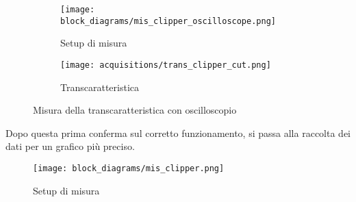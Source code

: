 \begin{figure}[H]
    \centering

    \begin{subfigure}{.5\textwidth}
        \centering
        \texttt{[image: block\_diagrams/mis\_clipper\_oscilloscope.png]}
        \caption{Setup di misura}
        \label{mis_clipper_oscilloscope}
    \end{subfigure}%
    \begin{subfigure}{.5\textwidth}
        \centering
        \texttt{[image: acquisitions/trans\_clipper\_cut.png]}
        \caption{Transcaratteristica}
        \label{clipper_transcharacteristic}
    \end{subfigure}

    \caption{Misura della transcaratteristica con oscilloscopio}
\end{figure}

Dopo questa prima conferma sul corretto funzionamento, si passa alla raccolta dei dati per un
grafico più preciso.

\begin{figure}[H]
    \centering
    \texttt{[image: block\_diagrams/mis\_clipper.png]}
    \caption{Setup di misura}
    \label{mis_clipper}
\end{figure}

